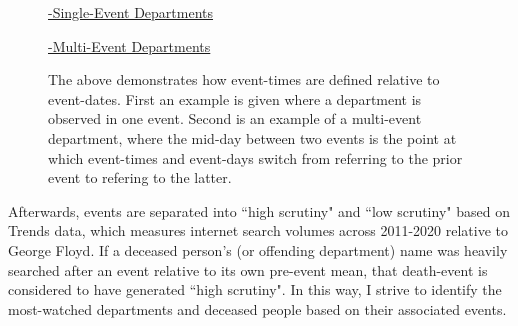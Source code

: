 \documentclass[12pt,a4paper]{article}
\begin{document}
\begin{figure}
	\begin{center}
		\noindent \underline{-Single-Event Departments} \\
		\underline{-Multi-Event Departments} \\
		\caption{The above demonstrates how event-times are defined relative to event-dates. First an example is given where a department is observed in one event. Second is an example of a multi-event department, where the mid-day between two events is the point at which event-times and event-days switch from referring to the prior event to refering to the latter.}
		\label{etime_diagram}
	\end{center}
\end{figure}

Afterwards, events are separated into ``high scrutiny" and ``low scrutiny" based on Trends data, which measures internet search volumes across 2011-2020 relative to George Floyd. If a deceased person's (or offending department) name was heavily searched after an event relative to its own pre-event mean, that death-event is considered to have generated ``high scrutiny". In this way, I strive to identify the most-watched departments and deceased people based on their associated events. \\
\end{document}
